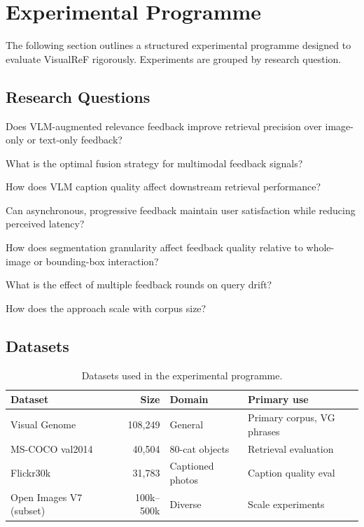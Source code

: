 \documentclass[12pt,a4paper]{article}
\begin{document}
\section{Experimental Programme}
\label{sec:experiments}

The following section outlines a structured experimental programme designed to
evaluate VisualReF rigorously. Experiments are grouped by research question.

\subsection{Research Questions}

\begin{description}[leftmargin=0em,style=nextline]
  \item[\textbf{RQ1.}] Does VLM-augmented relevance feedback improve retrieval
    precision over image-only or text-only feedback?
  \item[\textbf{RQ2.}] What is the optimal fusion strategy for multimodal
    feedback signals?
  \item[\textbf{RQ3.}] How does VLM caption quality affect downstream retrieval
    performance?
  \item[\textbf{RQ4.}] Can asynchronous, progressive feedback maintain user
    satisfaction while reducing perceived latency?
  \item[\textbf{RQ5.}] How does segmentation granularity affect feedback
    quality relative to whole-image or bounding-box interaction?
  \item[\textbf{RQ6.}] What is the effect of multiple feedback rounds on query
    drift?
  \item[\textbf{RQ7.}] How does the approach scale with corpus size?
\end{description}

\subsection{Datasets}

\begin{table}[h]
\centering
\caption{Datasets used in the experimental programme.}
\label{tab:datasets}
\begin{tabular}{@{}lrll@{}}
\toprule
\textbf{Dataset}    & \textbf{Size}  & \textbf{Domain} & \textbf{Primary use} \\
\midrule
Visual Genome~\citep{Krishna2017}       & 108,249 & General       & Primary corpus, VG phrases \\
MS-COCO val2014~\citep{Lin2014}         & 40,504  & 80-cat objects & Retrieval evaluation \\
Flickr30k~\citep{Young2014}             & 31,783  & Captioned photos & Caption quality eval \\
Open Images V7 (subset)~\citep{Kuznetsova2020} & 100k--500k & Diverse & Scale experiments \\
\bottomrule
\end{tabular}
\end{table}
\end{document}
